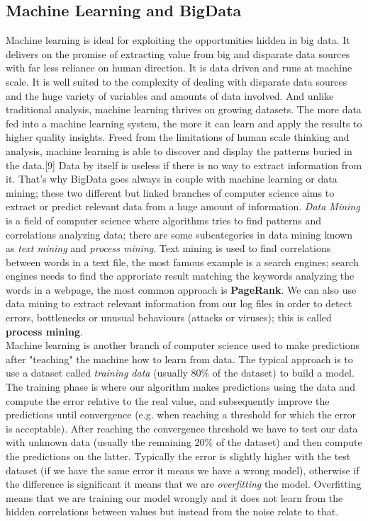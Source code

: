 \documentclass{sig-alternate-05-2015}
\begin{document}
\subsection{Machine Learning and BigData}
Machine learning is ideal for exploiting the opportunities hidden in big data.
It delivers on the promise of extracting value from big and disparate data sources with far less reliance on human
direction. It is data driven and runs at machine scale.
It is well suited to the complexity of dealing with disparate
data sources and the huge variety of variables and amounts of data involved.
And unlike traditional analysis, machine learning thrives on growing datasets.
The more data fed into a machine learning system, the more it can learn and apply
the results to higher quality insights.
Freed from the limitations of human scale thinking and analysis, machine learning is able to discover and display the patterns buried in the data.[9]
Data by itself is useless if there is no way to extract information from it.
That's why BigData goes always in couple with machine learning or data mining;
these two different but linked branches of computer science aims to extract or predict
relevant data from a huge amount of information. \textit{Data Mining} is a
field of computer science where algorithms tries to find patterns and correlations
analyzing data; there are some subcategories in data mining known as \textit{text mining}
and \textit{process mining}. Text mining is used to find correlations between words
in a text file, the most famous example is a search engines; search engines needs to
find the approriate result matching the keywords analyzing the words in a webpage, the most
common approach is \textbf{PageRank}. We can also use data mining to extract
relevant information from our log files in order to detect errors, bottlenecks
or unusual behaviours (attacks or viruses); this is called \textbf{process mining}.\\
Machine learning is another branch of computer science used to make predictions
after "teaching" the machine how to learn from data. The typical approach is
to use a dataset called \textit{training data} (usually 80$\%$ of the dataset) to
build a model. The training phase is where our algorithm makes predictions using
the data and compute the error relative to the real value, and subsequently
improve the predictions until convergence (e.g. when reaching a threshold for which
the error is acceptable). After reaching the convergence threshold we have to
test our data with unknown data (usually the remaining 20$\%$ of the dataset)
and then compute the predictions on the latter. Typically
the error is slightly higher with the test dataset (if we have the same error it means we have a wrong model),
otherwise if the difference is significant it means that we are \textit{overfitting} the model. Overfitting means
that we are training our model wrongly and it does not learn from the hidden correlations
between values but instead from the noise relate to that.
\end{document}
